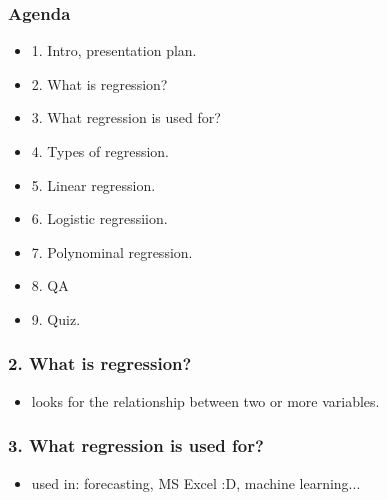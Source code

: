 \documentclass[handout,compress]{beamer} %
\begin{document}
\renewcommand{\logosinfootline}{\raisebox{0.12cm}{\begin{beamercolorbox}{rafi}{Seminar \quad Overview regression methods \hfill \insertframenumber/\inserttotalframenumber}\end{beamercolorbox}}}
\begin{frame}[allowframebreaks]
	\frametitle{Agenda}
    \begin{itemize}
    \item 1. Intro, presentation plan.
    \item 2. What is regression?
    \item 3. What regression is used for?
    \item 4. Types of regression.
    \item 5. Linear regression.
    \item 6. Logistic regressiion.
    \item 7. Polynominal regression.
    \item 8. QA
    \item 9. Quiz.
	\end{itemize}
\end{frame}
\begin{frame}
	\frametitle{2. What is regression?}
	\begin{itemize}
	\item looks for the relationship between two or more variables.
\end{itemize}		
\end{frame}
\begin{frame}
	\frametitle{3. What regression is used for?}	
	\begin{itemize}
	\item used in: forecasting, MS Excel :D, machine learning...
	\end{itemize}
\end{frame}
\end{document}
